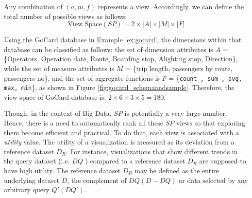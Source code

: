 Any combination of $(a, m, f)$ represents a view. Accordingly, we can define the total number of possible views as follows:
%
%
\begin{equation}
\text{View Space} (SP) = 2 \times |A| \times |M| \times|F|
\label{eq:viewspace}
\end{equation}
%
%
%
%
\begin{example}
  \label{ex:gocard_sp}
Using the GoCard database in Example \ref{ex:gocard}, the dimensions within that database can be classified as follows: the set of dimension attributes is $A$ = \{Operators, Operation date, Route, Boarding stop, Alighting stop, Direction\}, while the set of measure attributes is $M$ = \{trip length, passengers by route, passengers no\}, and the set of aggregate functions is $F$ = \{\texttt{count , sum , avg, max, min}\}, as shown in Figure \ref{fig:gocard_schemaandsample}.
%
Therefore, the view space of GoCard database is: $ 2 \times 6 \times 3 \times 5 = 180 $.
%
\end{example}
%
%
Though, in the context of Big Data, $SP$ is potentially a very large number. 
%
Hence, there is a need to automatically rank all these $SP$ views so that exploring them become efficient and practical.
%
To do that, each view is associated with a \emph{utility} value.
%
%
The utility of a visualization is measured as its deviation from a reference dataset $D_R$.
%
For instance, visualizations that show different trends in the query dataset (i.e. $DQ$ ) compared to a reference dataset $D_R$ are supposed to have high utility.
%
The reference dataset $D_R$ may be defined as the entire underlying dataset $D$, the complement of $DQ (D - DQ)$ 
or data selected by any arbitrary query $Q'(DQ')$.
%

